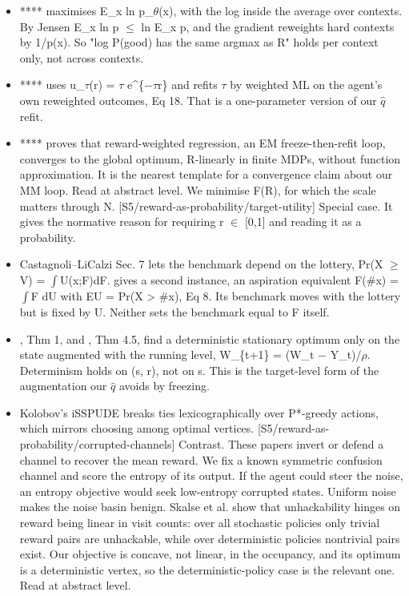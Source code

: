 \documentclass[10pt]{article}
\begin{document}
\begin{itemize}[nosep,leftmargin=1.2em]
\item **\citet{Tajwar-maximum26}** maximises E\_x ln p\_\ensuremath{\theta}(x), with the log inside the average over contexts. By Jensen E\_x ln p \ensuremath{\leq} ln E\_x p, and the gradient reweights hard contexts by 1/p(x). So "log P(good) has the same argmax as R" holds per context only, not across contexts.
\item **\citet{Peters-reinforcement07}** uses u\_\ensuremath{\tau}(r) = \ensuremath{\tau} e\^{}\{\ensuremath{-}\ensuremath{\tau}r\} and refits \ensuremath{\tau} by weighted ML on the agent's own reweighted outcomes, Eq 18. That is a one-parameter version of our \ensuremath{\hat{q}} refit.
\item **\citet{Strupl-reward21}** proves that reward-weighted regression, an EM freeze-then-refit loop, converges to the global optimum, R-linearly in finite MDPs, without function approximation. It is the nearest template for a convergence claim about our MM loop. Read at abstract level. We minimise F(R), for which the scale matters through N. [S5/reward-as-probability/target-utility] Special case. It gives the normative reason for requiring r \ensuremath{\in} [0,1] and reading it as a probability.
\item Castagnoli--LiCalzi Sec. 7 lets the benchmark depend on the lottery, Pr(X \ensuremath{\geq} V) = \ensuremath{\int}U(x;F)dF. \citet{Abbas-normative05} gives a second instance, an aspiration equivalent F(\#x) = \ensuremath{\int}F dU with EU = Pr(X \textgreater{} \#x), Eq 8. Its benchmark moves with the lottery but is fixed by U. Neither sets the benchmark equal to F itself.
\item \citet{White-minimizing93}, Thm 1, and \citet{Bouakiz-targetlevel95}, Thm 4.5, find a deterministic stationary optimum only on the state augmented with the running level, W\_\{t+1\} = (W\_t \ensuremath{-} Y\_t)/\ensuremath{\rho}. Determinism holds on (s, r), not on s. This is the target-level form of the augmentation our \ensuremath{\hat{q}} avoids by freezing.
\item Kolobov's iSSPUDE breaks ties lexicographically over P*-greedy actions, which mirrors choosing among optimal vertices. [S5/reward-as-probability/corrupted-channels] Contrast. These papers invert or defend a channel to recover the mean reward. We fix a known symmetric confusion channel and score the entropy of its output. If the agent could steer the noise, an entropy objective would seek low-entropy corrupted states. Uniform noise makes the noise basin benign. Skalse et al. show that unhackability hinges on reward being linear in visit counts: over all stochastic policies only trivial reward pairs are unhackable, while over deterministic policies nontrivial pairs exist. Our objective is concave, not linear, in the occupancy, and its optimum is a deterministic vertex, so the deterministic-policy case is the relevant one. Read at abstract level.
\end{itemize}
\end{document}

